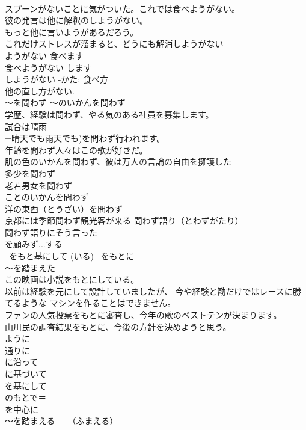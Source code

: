 \documentclass[8pt]{extreport}
\begin{document}
\begin{CJK}{UTF8}{min}
\\	スプーンがないことに気がついた。これでは食べようがない。
\\	彼の発言は他に解釈のしようがない。 
\\	もっと他に言いようがあるだろう。
\\	これだけストレスが溜まると、どうにも解消しようがない 
\\	ようがない 食べます 
\\	食べようがない します 
\\	しようがない	-かた; 食べ方 
\\	他の直し方がない. 
\\	～を問わず ～のいかんを問わず	
\\	学歴、経験は問わず、やる気のある社員を募集します。 
\\	試合は晴雨
\\	=晴天でも雨天でも)を問わず行われます。 
\\	年齢を問わず人々はこの歌が好きだ。 
\\	肌の色のいかんを問わず、彼は万人の言論の自由を擁護した
\\	多少を問わず 
\\	老若男女を問わず 
\\	ことのいかんを問わず 
\\	洋の東西（とうざい）を問わず 
\\	京都には季節問わず観光客が来る		問わず語り（とわずがたり）
\\	問わず語りにそう言った 
\\	を顧みず...する
\\	~をもと{基}にして (いる) ~をもとに 
\\	～を踏まえた	
\\	この映画は小説をもとにしている。
\\	以前は経験を元にして設計していましたが、 今や経験と勘だけではレースに勝てるような マシンを作ることはできません。 
\\	ファンの人気投票をもとに審査し、今年の歌のベストテンが決まります。 
\\	山川民の調査結果をもとに、今後の方針を決めようと思う。 
\\	ように 
\\	通りに 
\\	に沿って 
\\	に基づいて 
\\	を基にして 
\\	のもとで＝ 
\\	を中心に 
\\	～を踏まえる　　（ふまえる） 

\end{CJK}
\end{document}
